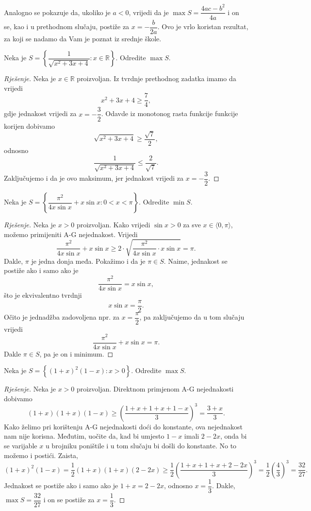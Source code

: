 \begin{remark}
Analogno se pokazuje da, ukoliko je $a<0$, vrijedi da je $\max{S}=\dfrac{4ac-b^2}{4a}$ i on se, kao i u prethodnom slučaju, postiže za $x=-\dfrac{b}{2a}$. Ovo je vrlo koristan rezultat, za koji se nadamo da Vam je poznat iz srednje škole.
\end{remark}

\begin{exercise}
Neka je $S=\left\{\dfrac{1}{\sqrt{x^2+3x+4}} : x\in \mathbb{R}\right\}$. Odredite $\max{S}$.
\end{exercise}
\begin{proof}[Rješenje]
Neka je $x\in \mathbb{R}$ proizvoljan. Iz tvrdnje prethodnog zadatka imamo da vrijedi $$x^2+3x+4\geq \dfrac{7}{4},$$
gdje jednakost vrijedi za $x=-\dfrac{3}{2}$. Odavde iz monotonog rasta funkcije funkcije korijen dobivamo $$\sqrt{x^2+3x+4}\geq \dfrac{\sqrt{7}}{2},$$
odnosno
$$\dfrac{1}{\sqrt{x^2+3x+4}}\leq \dfrac{2}{\sqrt{7}}.$$ Zaključujemo i da je ovo maksimum, jer jednakost vrijedi za $x=-\dfrac{3}{2}$.
\end{proof}
\begin{exercise}
Neka je $S=\left\{\dfrac{\pi^2}{4x\sin{x}}+x\sin{x} : 0<x<\pi\right\}$. Odredite $\min{S}$.
\end{exercise}
\begin{proof}[Rješenje]
Neka je $x>0$ proizvoljan. Kako vrijedi $\sin{x}>0$ za sve $x\in \langle 0, \pi\rangle$, možemo primijeniti A-G nejednakost. Vrijedi
$$\dfrac{\pi^2}{4x\sin{x}}+x\sin{x}\geq 2\cdot \sqrt{\dfrac{\pi^2}{4x\sin{x}}\cdot x\sin{x}}=\pi.$$
Dakle, $\pi$ je jedna donja međa. Pokažimo i da je $\pi\in S$. Naime, jednakost se postiže ako i samo ako je $$\dfrac{\pi^2}{4x\sin{x}}=x\sin{x},$$ što je ekvivalentno tvrdnji $$x\sin{x}=\dfrac{\pi}{2}.$$ Očito je jednadžba zadovoljena npr. za $x=\dfrac{\pi}{2}$, pa zaključujemo da u tom slučaju vrijedi $$\dfrac{\pi^2}{4x\sin{x}}+x\sin{x}=\pi.$$ Dakle $\pi\in S$, pa je on i minimum.
\end{proof}
\begin{exercise}
Neka je $S=\left\{(1+x)^2(1-x) : x>0\right\}$. Odredite $\max{S}$.
\end{exercise}
\begin{proof}[Rješenje]
Neka je $x>0$ proizvoljan. Direktnom primjenom A-G nejednakosti dobivamo $$(1+x)(1+x)(1-x)\geq \left(\dfrac{1+x+1+x+1-x}{3}\right)^3=\dfrac{3+x}{3}.$$ Kako želimo pri korištenju A-G nejednakosti doći do konstante, ova nejednakost nam nije korisna. Međutim, uočite da, kad bi umjesto $1-x$ imali $2-2x$, onda bi se varijable $x$ u brojniku poništile i u tom slučaju bi došli do konstante. No to možemo i postići. Zaista,
$$(1+x)^2(1-x)=\dfrac{1}{2}(1+x)(1+x)(2-2x)\geq \dfrac{1}{2}\left(\dfrac{1+x+1+x+2-2x}{3}\right)^3=\dfrac{1}{2}\left(\dfrac{4}{3}\right)^3=\dfrac{32}{27}.$$
Jednakost se postiže ako i samo ako je $1+x=2-2x$, odnosno $x=\dfrac{1}{3}$. Dakle, $\max{S}=\dfrac{32}{27}$ i on se postiže za $x=\dfrac{1}{3}$.
\end{proof}
